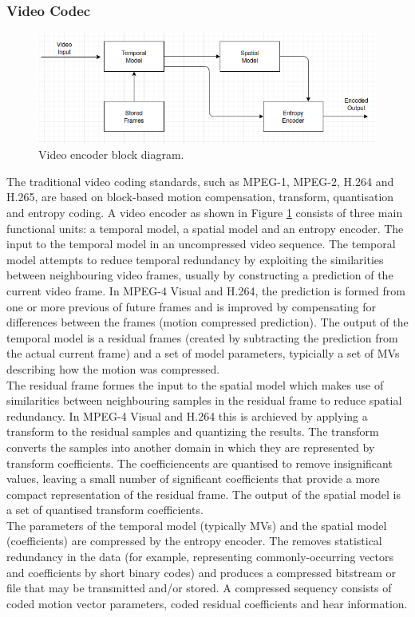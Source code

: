 \subsubsection{Video Codec}
\begin{figure}
\centering
 \includegraphics[width=0.8\linewidth]{Figures/encoder.png}
 \caption{Video encoder block diagram.}
 \label{fig:encoder}
\end{figure}
The traditional video coding standards, such as MPEG-1, MPEG-2, H.264 and H.265, are based on block-based motion compensation, transform, quantisation and entropy coding. A video encoder as shown in Figure \ref{fig:encoder} consists of three main functional units: a temporal model, a spatial model and an entropy encoder. The input to the temporal model in an uncompressed video sequence. The temporal model attempts to reduce temporal redundancy by exploiting the similarities between neighbouring video frames, usually by constructing a prediction of the current video frame. In MPEG-4 Visual and H.264, the prediction is formed from one or more previous of future frames and is improved by compensating for differences between the frames (motion compressed prediction). The output of the temporal model is a residual frames (created by subtracting the prediction from the actual current frame) and a set of model parameters, typicially a set of MVs describing how the motion was compressed. \\
The residual frame formes the input to the spatial model which makes use of similarities between neighbouring samples in the residual frame to reduce spatial redundancy. In MPEG-4 Visual and H.264 this is archieved by applying a transform to the residual samples and quantizing the results. The transform converts the samples into another domain in which they are represented by transform coefficients. The coefficiencents are quantised to remove insignificant values, leaving a small number of significant coefficients that provide a more compact representation of the residual frame. The output of the spatial model is a set of quantised transform coefficients.\\
The parameters of the temporal model (typically MVs) and the spatial model (coefficients) are compressed by the entropy encoder. The removes statistical redundancy in the data (for example, representing commonly-occurring  vectors and coefficients by short binary codes) and produces a compressed bitstream or file that may be transmitted and/or stored. A compressed sequency consists of coded motion vector parameters, coded residual coefficients and hear information.\\
